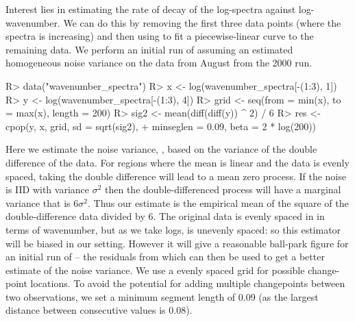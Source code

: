 \documentclass[article]{jss}
\begin{document}
Interest lies in estimating the rate of decay of the log-spectra against log-wavenumber. We can do this by removing the first three data points (where the spectra is increasing) and then using  to fit a piecewise-linear curve to the remaining data. We perform an initial run of  assuming an estimated homogeneous noise variance on the data from August from the 2000 run.
\begin{CodeChunk}
\begin{CodeInput}
R> data("wavenumber_spectra")
R> x <- log(wavenumber_spectra[-(1:3), 1])
R> y <- log(wavenumber_spectra[-(1:3), 4])
R> grid <- seq(from = min(x), to = max(x), length = 200)
R> sig2 <- mean(diff(diff(y)) ^ 2) / 6 
R> res <- cpop(y, x, grid, sd = sqrt(sig2), 
+              minseglen = 0.09, beta = 2 * log(200))
\end{CodeInput}
\end{CodeChunk}
Here we estimate the noise variance, , based on the variance of the double difference of the data. For regions where the mean is linear and the data is evenly spaced, taking the double difference will lead to a mean zero process. If the noise is IID with variance $\sigma^2$ then the double-differenced process will have a marginal variance that is $6\sigma^2$. Thus our estimate is the empirical mean of the square of the double-difference data divided by 6. The original data is evenly spaced in in terms of wavenumber, but as we take logs,  is unevenly spaced: so this estimator will be biased in our setting. However it will give a reasonable ball-park figure for an initial run of  -- the residuals from which can then be used to get a better estimate of the noise variance. We use a evenly spaced grid for possible change-point locations. To avoid the potential for adding multiple changepoints between two observations, we set a minimum segment length of 0.09 (as the largest distance between consecutive  values is 0.08).
\end{document}
